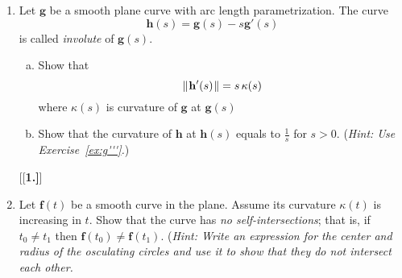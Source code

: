 \begin{enumerate}[\bfseries 1.]
  \item Let $\mathbf{g}$ be a smooth plane curve with arc length parametrization.
  The curve \[\mathbf{h}(s)=\mathbf{g}(s)-s\mathbf{g}'(s)\] is called \emph{involute} of $\mathbf{g}(s)$.
  \begin{enumerate}[(a)]
  \item Show that 
  \[\lVert\mspace{1mu}\mathbf{h}'(s)\mspace{1mu}\rVert=s\,\kappa(s)\] 
  where $\kappa(s)$ is curvature of $\mathbf{g}$ at $\mathbf{g}(s)$
  \item Show that the curvature of $\mathbf{h}$ at $\mathbf{h}(s)$ equals to $\tfrac1s$ for $s>0$. (\emph{Hint: Use Exercise~\ref{ex:g'''}.})
  \end{enumerate}
[{[\bfseries 1.]}]
   \item Let $\mathbf{f}(t)$ be a smooth curve in the plane.
   Assume its curvature $\kappa(t)$ is increasing in $t$.
   Show that the curve has \emph{no self-intersections};
   that is, if $t_0\ne t_1$ then $\mathbf{f}(t_0)\ne\mathbf{f}(t_1)$.
   (\textit{Hint: Write an expression for the center and radius of the osculating circles and use it to show that they do not intersect each other.}
\end{enumerate}
